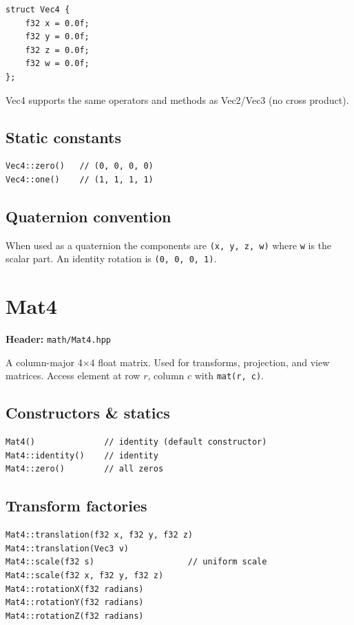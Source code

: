 \begin{lstlisting}
struct Vec4 {
    f32 x = 0.0f;
    f32 y = 0.0f;
    f32 z = 0.0f;
    f32 w = 0.0f;
};
\end{lstlisting}

Vec4 supports the same operators and methods as Vec2/Vec3 (no cross product).

\subsection{Static constants}

\begin{lstlisting}
Vec4::zero()   // (0, 0, 0, 0)
Vec4::one()    // (1, 1, 1, 1)
\end{lstlisting}

\subsection{Quaternion convention}

When used as a quaternion the components are \texttt{(x, y, z, w)} where
\texttt{w} is the scalar part. An identity rotation is \texttt{(0, 0, 0, 1)}.

\section{Mat4}
\label{sec:mat4}

\textbf{Header:} \texttt{math/Mat4.hpp}

A column-major 4$\times$4 float matrix. Used for transforms, projection, and
view matrices. Access element at row $r$, column $c$ with
\texttt{mat(r, c)}.

\subsection{Constructors \& statics}

\begin{lstlisting}
Mat4()              // identity (default constructor)
Mat4::identity()    // identity
Mat4::zero()        // all zeros
\end{lstlisting}

\subsection{Transform factories}

\begin{lstlisting}
Mat4::translation(f32 x, f32 y, f32 z)
Mat4::translation(Vec3 v)
Mat4::scale(f32 s)                   // uniform scale
Mat4::scale(f32 x, f32 y, f32 z)
Mat4::rotationX(f32 radians)
Mat4::rotationY(f32 radians)
Mat4::rotationZ(f32 radians)
\end{lstlisting}

